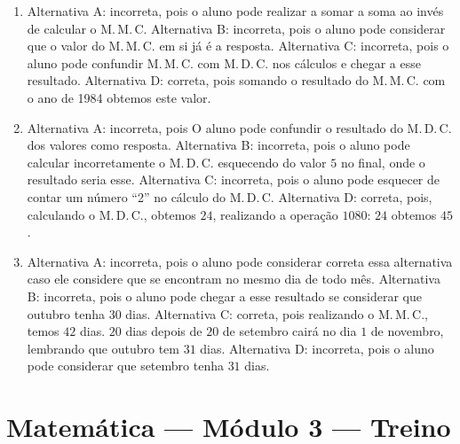 \begin{enumerate}
\item Alternativa A: incorreta, pois o aluno pode realizar a somar a soma ao
invés de calcular o M.\,M.\,C.
Alternativa B: incorreta, pois o aluno pode considerar que o valor do
M.\,M.\,C. em si já é a resposta.
Alternativa C: incorreta, pois o aluno pode confundir M.\,M.\,C. com M.\,D.\,C.
nos cálculos e chegar a esse resultado.
Alternativa D: correta, pois somando o resultado do M.\,M.\,C. com o ano de
1984 obtemos este valor.

\item Alternativa A: incorreta, pois O aluno pode confundir o resultado do
M.\,D.\,C. dos valores como resposta.
Alternativa B: incorreta, pois o aluno pode calcular incorretamente o
M.\,D.\,C. esquecendo do valor $5$ no final, onde o resultado seria esse.
Alternativa C: incorreta, pois o aluno pode esquecer de contar um número
``2'' no cálculo do M.\,D.\,C.
Alternativa D: correta, pois, calculando o M.\,D.\,C., obtemos $24$,
realizando a operação $1080$: $24$ obtemos $45$.

\item Alternativa A: incorreta, pois o aluno pode considerar correta essa
alternativa caso ele considere que se encontram no mesmo dia de todo
mês.
Alternativa B: incorreta, pois o aluno pode chegar a esse resultado se
considerar que outubro tenha $30$ dias.
Alternativa C: correta, pois realizando o M.\,M.\,C., temos $42$ dias. $20$ dias
depois de $20$ de setembro cairá no dia $1$ de novembro, lembrando que
outubro tem $31$ dias.
Alternativa D: incorreta, pois o aluno pode considerar que setembro
tenha $31$ dias.
\end{enumerate}

\section*{Matemática — Módulo 3 — Treino}

